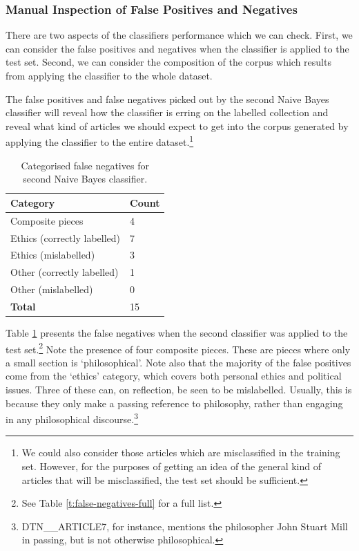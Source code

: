 \documentclass{article}
\begin{document}
\subsubsection{Manual Inspection of False Positives and Negatives}

There are two aspects of the classifiers performance which we can check. First, we can consider the false positives and negatives when the classifier is applied to the test set. Second, we can consider the composition of the corpus which results from applying the classifier to the whole dataset.

The false positives and false negatives picked out by the second Naive Bayes classifier will reveal how the classifier is erring on the labelled collection and reveal what kind of articles we should expect to get into the corpus generated by applying the classifier to the entire dataset.\footnote{We could also consider those articles which are misclassified in the training set. However, for the purposes of getting an idea of the general kind of articles that will be misclassified, the test set should be sufficient.}

\begin{table}[]
        \centering
        \footnotesize
        \begin{tabular}{l|l}
          Category & Count \\
          \hline
          Composite pieces & 4 \\
          Ethics (correctly labelled) & 7 \\
          Ethics (mislabelled) & 3 \\
          Other (correctly labelled) & 1\\
          Other (mislabelled) & 0 \\
          \textbf{Total} & 15\\
        \end{tabular}
        \caption{Categorised false negatives for second Naive Bayes classifier.}
        \label{t:false-negatives}
\end{table}

Table \ref{t:false-negatives} presents the false negatives when the second classifier was applied to the test set.\footnote{See Table \ref{t:false-negatives-full} for a full list.} Note the presence of four composite pieces. These are pieces where only a small section is `philosophical'. Note also that the majority of the false positives come from the `ethics' category, which covers both personal ethics and political issues. Three of these can, on reflection, be seen to be mislabelled. Usually, this is because they only make a passing reference to philosophy, rather than engaging in any philosophical discourse.\footnote{DTN\_\_\-ARTICLE7, for instance, mentions the philosopher John Stuart Mill in passing, but is not otherwise philosophical.} %
\end{document}
